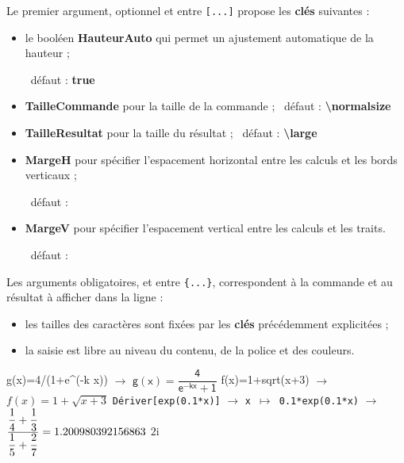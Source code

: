 \documentclass[french,a4paper,11pt]{article}
\newcommand\Cle[1]{{\bfseries\sffamily\textlangle #1\textrangle}}
\begin{document}
\begin{tipblock}
Le premier argument, optionnel et entre \texttt{[...]} propose les \Cle{clés} suivantes :

\begin{itemize}
	\item le booléen \Cle{HauteurAuto} qui permet un ajustement automatique de la hauteur ;
	
	\hfill~défaut : \Cle{true}
	\item \Cle{TailleCommande} pour la taille de la commande ; \hfill~défaut : \Cle{\textbackslash normalsize}
	\item \Cle{TailleResultat} pour la taille du résultat ; \hfill~défaut : \Cle{\textbackslash large}
	\item \Cle{MargeH} pour spécifier l'espacement horizontal entre les calculs et les bords verticaux ;
	
	\hfill~défaut : \Cle{0.2}
	\item \Cle{MargeV} pour spécifier l'espacement vertical entre les calculs et les traits.
	
	\hfill~défaut : \Cle{6pt}
\end{itemize}
\vspace*{-\baselineskip}\leavevmode
\end{tipblock}

\begin{tipblock}
Les arguments obligatoires, et entre \texttt{\{...\}}, correspondent à la commande et au résultat à afficher dans la ligne :

\begin{itemize}
	\item les tailles des caractères sont fixées par les \Cle{clés} précédemment explicitées ;
	\item la saisie est libre au niveau du contenu, de la police et des couleurs.
\end{itemize}
\end{tipblock}

\begin{PresentationCode}{}
\begin{CalculFormelGeogebra}[CouleurEntete=pink!25,CouleurNumero=yellow!25,Largeur=15]
	\LigneCalculsGeogebra%
		{\sffamily g(x)=4/(1+e\textasciicircum(-k x))}
		{$\rightarrow$ \: $\mathsf{g(x)=\dfrac{4}{e^{-kx}+1}}$}
	\LigneCalculsGeogebra
		{f(x)=1+sqrt(x+3)}
		{$\rightarrow$ \: $f(x)=1+\sqrt{x+3}$}
	\LigneCalculsGeogebra
		{\texttt{Dériver[exp(0.1*x)]}}
		{$\rightarrow$ \: \texttt{x $\mapsto$ 0.1*exp(0.1*x)}}
		{$\rightarrow$ \: $\dfrac{\dfrac14+\dfrac13}{\dfrac15+\dfrac27}=
			\fpeval{(1/4+1/3)/(1/5+2/7)}$}
		{$2\text{i}$}
\end{CalculFormelGeogebra}
\end{PresentationCode}
\end{document}
